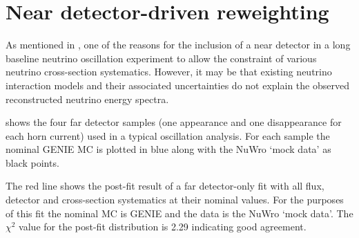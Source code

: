 \section{Near detector-driven reweighting}
\label{sec:dune_ndrwt:rwt}

As mentioned in , one of the reasons for the inclusion of a near detector in a long baseline neutrino oscillation experiment to allow the constraint of various neutrino cross-section systematics.
However, it may be that existing neutrino interaction models and their associated uncertainties do not explain the observed reconstructed neutrino energy spectra.


 shows the four far detector samples (one appearance and one disappearance for each horn current) used in a typical oscillation analysis.
For each sample the nominal GENIE MC is plotted in blue along with the NuWro `mock data' as black points.

The red line shows the post-fit result of a far detector-only fit with all flux, detector and cross-section systematics at their nominal values. 
For the purposes of this fit the nominal MC is GENIE and the data is the NuWro `mock data'.
The $\chi^{2}$ value for the post-fit distribution is 2.29 indicating good agreement.

